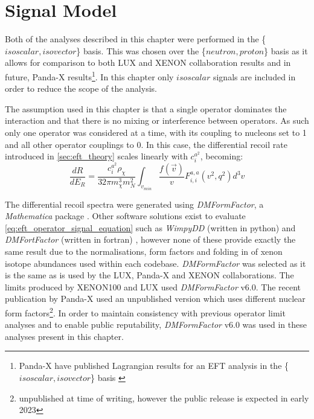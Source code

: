 \section{Signal Model}
\label{sec:eft_signal_models}
\par
Both of the analyses described in this chapter were performed in the \{$isoscalar,isovector$\} basis.
This was chosen over the \{$neutron,proton$\} basis as it allows for comparison to both LUX and XENON collaboration results and in future, Panda-X results\footnote{Panda-X have published Lagrangian results for an EFT analysis in the \{$isoscalar,isovector$\} basis \cite{pandax_2_eft_ref}}.
In this chapter only $isoscalar$ signals are included in order to reduce the scope of the analysis.

\par
The assumption used in this chapter is that a single operator dominates the interaction and that there is no mixing or interference between operators.
As such only one operator was considered at a time, with its coupling to nucleons set to 1 and all other operator couplings to 0.
In this case, the differential recoil rate introduced in \autoref{sec:eft_theory} scales linearly with $c^{a^2}_i$, becoming:
\begin{equation}
    \frac{dR}{dE_R} = \frac{c^{a^2}_i \rho_\chi}{32 \pi m^3_\chi m^2_N} \int_{v_{min}} \frac{f(\vec{v})}{v} F^{a,a}_{i,i} (v^2, q^2) d^3 v
    \label{eq:eft_operator_signal_equation}
\end{equation}


\par
The differential recoil spectra were generated using \textit{DMFormFactor}, a \textit{Mathematica} package \cite{dmformfactor_ref}.
Other software solutions exist to evaluate \autoref{eq:eft_operator_signal_equation} such as \textit{WimpyDD} (written in python) \cite{wimpydd_ref} and \textit{DMFortFactor} (written in fortran) \cite{dmfortfactor_ref}, however none of these provide exactly the same result due to the normalisations, form factors and folding in of xenon isotope abundances used within each codebase.
\textit{DMFormFactor} was selected as it is the same as is used by the LUX, Panda-X and XENON collaborations.
The limits produced by XENON100 \cite{xenon100_eft_ref} and LUX \cite{LUX_RUN4_EFT_2021} used \textit{DMFormFactor} v6.0.
The recent publication by Panda-X \cite{pandax_2_eft_ref} used an unpublished version which uses different nuclear form factors\footnote{unpublished at time of writing, however the public release is expected in early 2023}.
In order to maintain consistency with previous operator limit analyses and to enable public reputability, \textit{DMFormFactor} v6.0 was used in these analyses present in this chapter.

